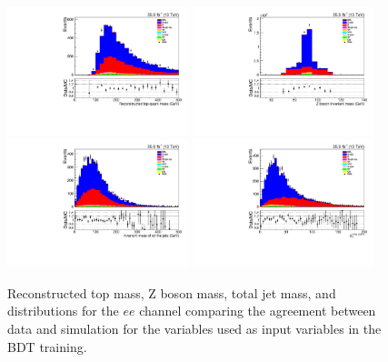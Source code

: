 \begin{figure}[htb]
\centering
\includegraphics[width=0.47\textwidth]{figs/background-estimation/plots/unblinded/prompt_ee_ttbarInc/topMass_NPL_ee_wMass_ee.pdf}
\includegraphics[width=0.47\textwidth]{figs/background-estimation/plots/unblinded/prompt_ee_ttbarInc/zPairMass_NPL_ee_wMass_ee.pdf}
\\
\includegraphics[width=0.47\textwidth]{figs/background-estimation/plots/unblinded/prompt_ee_ttbarInc/totalJetMass_NPL_ee_wMass_ee.pdf}
\includegraphics[width=0.47\textwidth]{figs/background-estimation/plots/unblinded/prompt_ee_ttbarInc/met_NPL_ee_wMass_ee.pdf}
\caption{
Reconstructed top mass, Z boson mass, total jet mass, and \MET distributions for the $ee$ channel comparing the agreement between data and simulation for the variables used as input variables in the BDT training.}
\label{fig:appInputFeaturesDataSimAgreement0}
\end{figure}

